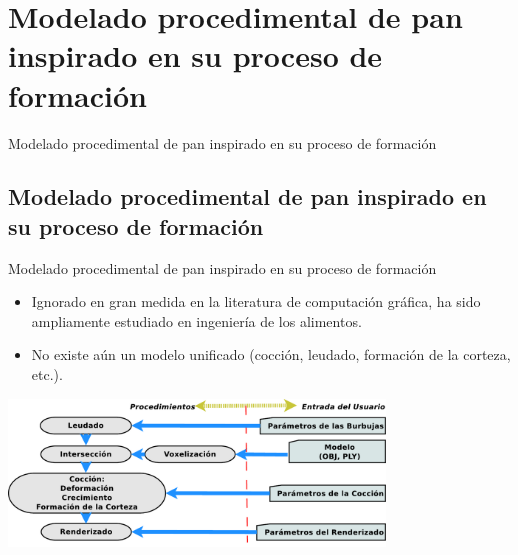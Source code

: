 \documentclass[spanish,unknownkeysallowed,10pt]{beamer}
\begin{document}
\section[Modelado de Pan]{Modelado procedimental de pan inspirado en su proceso de formación}


\begin{frame}
\begin{block}{}
\begin{center}
\vspace{1cm}
\huge{Modelado procedimental de pan inspirado en su proceso de formación}
\vspace{1cm}
\end{center}
\end{block}
\end{frame}

\subsection{Modelado procedimental de pan inspirado en su proceso de formación}
\begin{frame}{Modelado procedimental de pan inspirado en su proceso de formación}
\begin{block}{}
\begin{itemize}
\item Ignorado en gran medida en la literatura de computación gráfica, ha sido ampliamente estudiado en ingeniería de los alimentos.
\item No existe aún un modelo unificado (cocción, leudado, formación de la corteza, etc.).
\end{itemize}
\end{block}

\centerline{\includegraphics[width=10cm]{../figures/pipeline}}
\end{frame}
\end{document}
